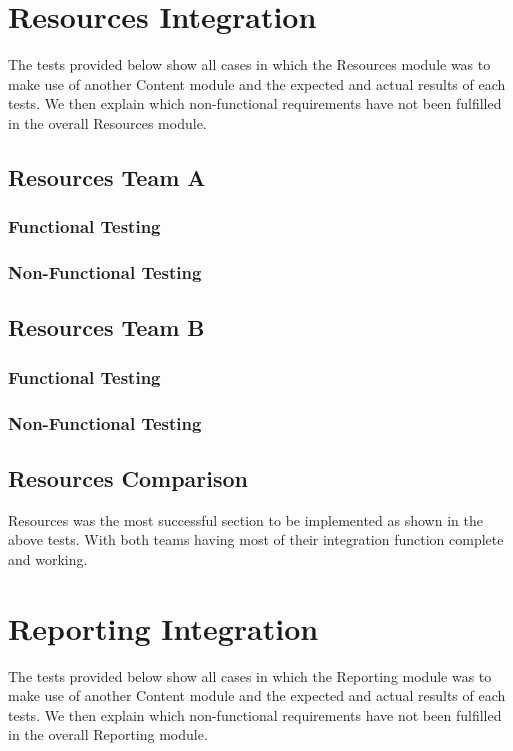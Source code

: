 \documentclass[12pt, oneside]{article}
\begin{document}
\newpage 
\section{Resources Integration}
The tests provided below show all cases in which the Resources module was to make use of another Content module and the expected and actual results of each tests. We then explain which non-functional requirements have not been fulfilled in the overall Resources module.
	\subsection{Resources Team A}	
		\subsubsection{Functional Testing}
			
		\subsubsection{Non-Functional Testing }
			
	
	\subsection{Resources Team B}	
		\subsubsection{Functional Testing}
			
		\subsubsection{Non-Functional Testing }
			
			
	
	\subsection{Resources Comparison}
	Resources was the most successful section to be implemented as shown in the above tests. With both teams having most of their integration function complete and working.
	
	
\newpage 
\section{Reporting Integration}
The tests provided below show all cases in which the Reporting module was to make use of another Content module and the expected and actual results of each tests. We then explain which non-functional requirements have not been fulfilled in the overall Reporting module.
\end{document}

